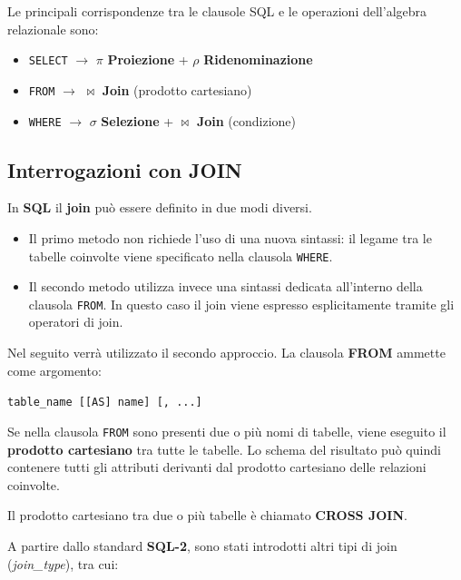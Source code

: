 Le principali corrispondenze tra le clausole SQL e le operazioni
dell'algebra relazionale sono:

\begin{itemize}
	
	\item \texttt{SELECT} $\rightarrow$ $\pi$ \textbf{Proiezione} + $\rho$ \textbf{Ridenominazione}
	
	\item \texttt{FROM} $\rightarrow$ $\bowtie$ \textbf{Join} (prodotto cartesiano)
	
	\item \texttt{WHERE} $\rightarrow$ $\sigma$ \textbf{Selezione} + $\bowtie$ \textbf{Join} (condizione)
	
\end{itemize}
\subsection{Interrogazioni con JOIN}
In \textbf{SQL} il \textbf{join} può essere definito in due modi diversi.

\begin{itemize}
	
	\item Il primo metodo non richiede l'uso di una nuova sintassi: il legame tra
	le tabelle coinvolte viene specificato nella clausola \texttt{WHERE}.
	
	\item Il secondo metodo utilizza invece una sintassi dedicata all'interno
	della clausola \texttt{FROM}. In questo caso il join viene espresso
	esplicitamente tramite gli operatori di join.
	
\end{itemize}

Nel seguito verrà utilizzato il secondo approccio.
La clausola \textbf{FROM} ammette come argomento:

\begin{center}
	\texttt{table\_name [[AS] name] [, ...]}
\end{center}

Se nella clausola \texttt{FROM} sono presenti due o più nomi di tabelle,
viene eseguito il \textbf{prodotto cartesiano} tra tutte le tabelle.
Lo schema del risultato può quindi contenere tutti gli attributi
derivanti dal prodotto cartesiano delle relazioni coinvolte.

Il prodotto cartesiano tra due o più tabelle è chiamato
\textbf{CROSS JOIN}.

A partire dallo standard \textbf{SQL-2}, sono stati introdotti
altri tipi di join (\textit{join\_type}), tra cui:

